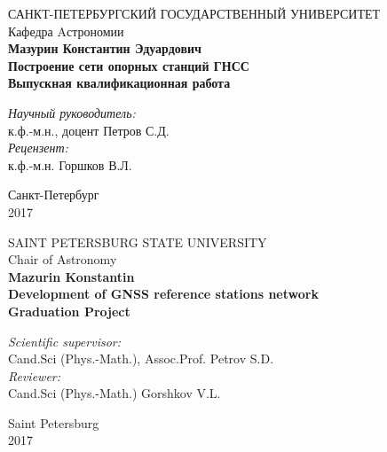 \documentclass[a4paper,12pt]{report}
\begin{document}
\begin{titlepage}
\begin{center}
{\large САНКТ-ПЕТЕРБУРГСКИЙ ГОСУДАРСТВЕННЫЙ УНИВЕРСИТЕТ \\[6mm] Кафедра Aстрономии }\\
\vspace{2cm}
{\Large \bf Мазурин Константин Эдуардович } \\
\vspace{2cm}
{\LARGE \bf Построение сети опорных станций ГНСС} \\
\vspace{2cm}
{\large \bf Выпускная квалификационная работа } \\[3cm]
\end{center}

\begin{flushright}
{\it Научный руководитель:} \\
к.ф.-м.н., доцент {\Large Петров С.Д.}\\ [4mm]
{\it Рецензент:} \\
к.ф.-м.н. {\Large Горшков В.Л.} \\ 
\end{flushright}
\vspace{5cm}
\begin{center}
{\large Санкт-Петербург \\[5mm] 2017}
\end{center}
\end{titlepage}

\begin{titlepage}
\begin{center}
{\large SAINT PETERSBURG STATE UNIVERSITY \\[6mm] Chair of Astronomy }\\
\vspace{2cm}
{\Large \bf Mazurin Konstantin } \\
\vspace{2cm}
{\LARGE \bf Development of GNSS reference stations network } \\
\vspace{2cm}
{\large \bf Graduation Project } \\[3cm]
\end{center}

\begin{flushright}
{\it Scientific supervisor:} \\
Cand.Sci (Phys.-Math.), Assoc.Prof. {\Large Petrov S.D.}\\ [4mm]
{\it Reviewer:} \\
Cand.Sci (Phys.-Math.) {\Large Gorshkov V.L.}\\ 
\end{flushright}
\vspace{5cm}
\begin{center}
{\large Saint Petersburg \\[5mm] 2017}
\end{center}
\end{titlepage}
\end{document}
